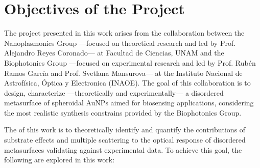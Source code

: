 
\section*{Objectives of the Project}

The project presented in this work arises from the collaboration  between the Nanoplasmonics Group ---focused on theoretical research and led by Prof. Alejandro Reyes Coronado--- at Facultad de Ciencias, UNAM and the Biophotonics Group ---focused on experimental research and led by Prof. Rubén Ramos García and Prof. Svetlana Mansurova--- at the Instituto Nacional de Astrofísica, Óptica y Electronica (INAOE). The goal of this collaboration is to design, characterize ---theoretically and experimentally--- a disordered  metasurface of spheroidal AuNPs aimed for biosensing applications, considering the most realistic synthesis constrains provided by the Biophotonics Group.

The  of this work is to theoretically identify and quantify the contributions of substrate effects and multiple scattering to the optical response of  disordered metasurfaces validating against experimental data. To achieve this goal, the following  are explored in this work:

